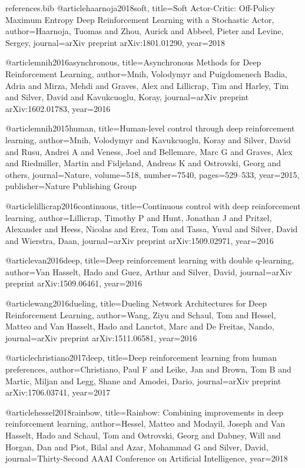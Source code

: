 \documentclass[12pt]{article}
\begin{document}
\begin{filecontents}{references.bib}
@article{haarnoja2018soft,
  title={Soft Actor-Critic: Off-Policy Maximum Entropy Deep Reinforcement Learning with a Stochastic Actor},
  author={Haarnoja, Tuomas and Zhou, Aurick and Abbeel, Pieter and Levine, Sergey},
  journal={arXiv preprint arXiv:1801.01290},
  year={2018}
}

@article{mnih2016asynchronous,
  title={Asynchronous Methods for Deep Reinforcement Learning},
  author={Mnih, Volodymyr and Puigdomenech Badia, Adria and Mirza, Mehdi and Graves, Alex and Lillicrap, Tim and Harley, Tim and Silver, David and Kavukcuoglu, Koray},
  journal={arXiv preprint arXiv:1602.01783},
  year={2016}
}

@article{mnih2015human,
  title={Human-level control through deep reinforcement learning},
  author={Mnih, Volodymyr and Kavukcuoglu, Koray and Silver, David and Rusu, Andrei A and Veness, Joel and Bellemare, Marc G and Graves, Alex and Riedmiller, Martin and Fidjeland, Andreas K and Ostrovski, Georg and others},
  journal={Nature},
  volume={518},
  number={7540},
  pages={529--533},
  year={2015},
  publisher={Nature Publishing Group}
}

@article{lillicrap2016continuous,
  title={Continuous control with deep reinforcement learning},
  author={Lillicrap, Timothy P and Hunt, Jonathan J and Pritzel, Alexander and Heess, Nicolas and Erez, Tom and Tassa, Yuval and Silver, David and Wierstra, Daan},
  journal={arXiv preprint arXiv:1509.02971},
  year={2016}
}

@article{van2016deep,
  title={Deep reinforcement learning with double q-learning},
  author={Van Hasselt, Hado and Guez, Arthur and Silver, David},
  journal={arXiv preprint arXiv:1509.06461},
  year={2016}
}

@article{wang2016dueling,
  title={Dueling Network Architectures for Deep Reinforcement Learning},
  author={Wang, Ziyu and Schaul, Tom and Hessel, Matteo and Van Hasselt, Hado and Lanctot, Marc and De Freitas, Nando},
  journal={arXiv preprint arXiv:1511.06581},
  year={2016}
}

@article{christiano2017deep,
  title={Deep reinforcement learning from human preferences},
  author={Christiano, Paul F and Leike, Jan and Brown, Tom B and Martic, Miljan and Legg, Shane and Amodei, Dario},
  journal={arXiv preprint arXiv:1706.03741},
  year={2017}
}

@article{hessel2018rainbow,
  title={Rainbow: Combining improvements in deep reinforcement learning},
  author={Hessel, Matteo and Modayil, Joseph and Van Hasselt, Hado and Schaul, Tom and Ostrovski, Georg and Dabney, Will and Horgan, Dan and Piot, Bilal and Azar, Mohammad G and Silver, David},
  journal={Thirty-Second AAAI Conference on Artificial Intelligence},
  year={2018}
}

\end{filecontents}



\end{document}
